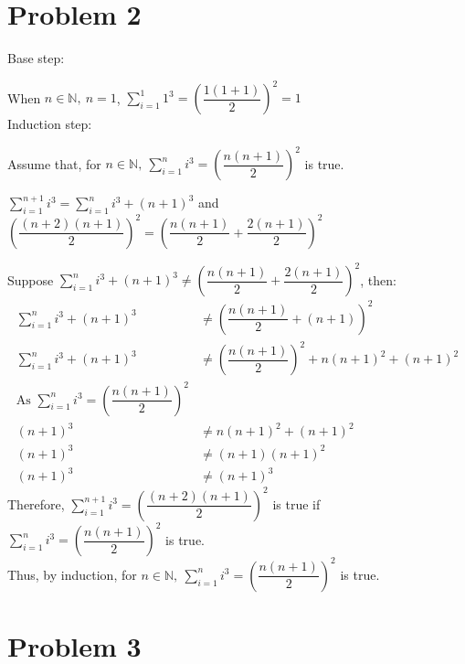 \documentclass{article}
\begin{document}
\section*{Problem 2}
    Base step:

    When \(n\in \mathbb{N},\ n=1\), \(\displaystyle{\sum_{i = 1}^{1} 1^3}= \left(\dfrac{1(1+1)}{2}\right)^2=1\)\\
    Induction step:

    Assume that, for \(n\in \mathbb{N},\ \displaystyle{\sum_{i=1}^n i^3}=\left(\dfrac{n(n+1)}{2}\right)^2\) is true.

    \(\displaystyle{\sum^{n+1}_{i=1}i^3}=\displaystyle{\sum_{i=1}^n i^3}+(n+1)^3\) and \(\left(\dfrac{(n+2)(n+1)}{2}\right)^2=\left(\dfrac {n(n+1)}{2}+\dfrac{2(n+1)}{2}\right)^2\)
    
    Suppose \(\displaystyle{\sum_{i=1}^n i^3}+(n+1)^3\neq \left(\dfrac {n(n+1)}{2}+\dfrac{2(n+1)}{2}\right)^2\), then:\\
    \begin{align*}
        \sum_{i=1}^n i^3+(n+1)^3&\neq \left(\dfrac {n(n+1)}{2}+(n+1)\right)^2\\
        \sum_{i=1}^n i^3+(n+1)^3&\neq \left(\dfrac {n(n+1)}{2}\right)^2 +n(n+1)^2+(n+1)^2\\
        \text{As } \displaystyle{\sum_{i=1}^n i^3}=\left(\dfrac{n(n+1)}{2}\right)^2\\
        (n+1)^3&\neq n(n+1)^2+(n+1)^2\\
        (n+1)^3&\neq (n+1)(n+1)^2\\
        (n+1)^3&\neq (n+1)^3
    \end{align*}
    Therefore, \(\displaystyle{\sum_{i=1}^{n+1} i^3} = \left(\dfrac {(n+2)(n+1)}{2}\right)^2\) is true if \(\displaystyle{\sum_{i=1}^n i^3}=\left(\dfrac{n(n+1)}{2}\right)^2\) is true.\\
    Thus, by induction, for \(n\in \mathbb{N},\ \displaystyle{\sum_{i=1}^n i^3}=\left(\dfrac{n(n+1)}{2}\right)^2\) is true.
\newpage
\section*{Problem 3}
\end{document}
